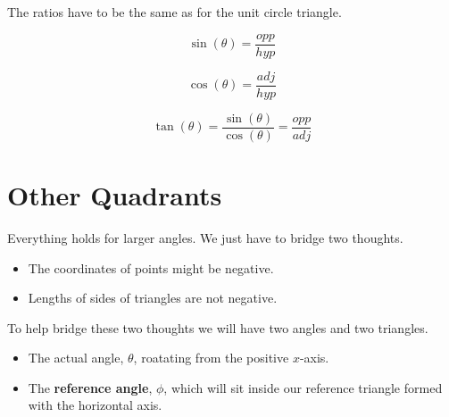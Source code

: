 \documentclass{ximera}
\begin{document}
\begin{image}[3in]
  \end{image}


The ratios have to be the same as for the unit circle triangle.


\[   \sin(\theta) = \frac{opp}{hyp}           \]



\[   \cos(\theta) = \frac{adj}{hyp}           \]




\[   \tan(\theta) = \frac{\sin(\theta)}{\cos(\theta)}    = \frac{opp}{adj}        \]








\section{Other Quadrants}


Everything holds for larger angles.  We just have to bridge two thoughts.  


\begin{itemize}
\item The coordinates of points might be negative.  
\item Lengths of sides of triangles are not negative.
\end{itemize}

To help bridge these two thoughts we will have two angles and two triangles.  


\begin{itemize}
\item The actual angle, $\theta$, roatating from the positive $x$-axis.  
\item The \textbf{reference angle}, $\phi$, which will sit inside our reference triangle formed with the horizontal axis.
\end{itemize}
\end{document}
